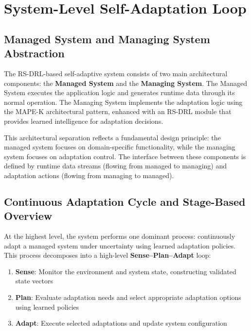 \documentclass[11pt,a4paper]{article}
\begin{document}

\section{System-Level Self-Adaptation Loop}
\label{sec:system-loop}

\subsection{Managed System and Managing System Abstraction}
\label{subsec:managed-managing}

The RS-DRL-based self-adaptive system consists of two main architectural components: the \textbf{Managed System} and the \textbf{Managing System}. The Managed System executes the application logic and generates runtime data through its normal operation. The Managing System implements the adaptation logic using the MAPE-K architectural pattern, enhanced with an RS-DRL module that provides learned intelligence for adaptation decisions.

This architectural separation reflects a fundamental design principle: the managed system focuses on domain-specific functionality, while the managing system focuses on adaptation control. The interface between these components is defined by runtime data streams (flowing from managed to managing) and adaptation actions (flowing from managing to managed).

\subsection{Continuous Adaptation Cycle and Stage-Based Overview}
\label{subsec:adaptation-cycle}

At the highest level, the system performs one dominant process: continuously adapt a managed system under uncertainty using learned adaptation policies. This process decomposes into a high-level \textbf{Sense--Plan--Adapt} loop:

\begin{enumerate}
    \item \textbf{Sense}: Monitor the environment and system state, constructing validated state vectors
    \item \textbf{Plan}: Evaluate adaptation needs and select appropriate adaptation options using learned policies
    \item \textbf{Adapt}: Execute selected adaptations and update system configuration
\end{enumerate}
\end{document}
